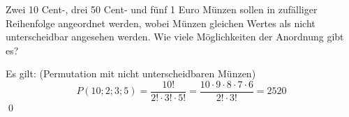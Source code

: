 \documentclass{abgabe}
\begin{document}
\begin{questions}
    \question
    Zwei 10 Cent-, drei 50 Cent- und fünf 1 Euro Münzen sollen in zufälliger Reihenfolge angeordnet werden, wobei Münzen gleichen Wertes als nicht unterscheidbar angesehen werden. 
    Wie viele Möglichkeiten der Anordnung gibt es?
    \begin{solution}
        Es gilt:  (Permutation mit nicht unterscheidbaren Münzen)
        \[
            P(10;2;3;5) = \frac{10!}{2! \cdot 3! \cdot 5!} = \frac{10 \cdot 9 \cdot 8 \cdot 7 \cdot 6}{2! \cdot 3!} = \num{2520}
        \]\qed
    \end{solution}
\end{questions}
\end{document}
